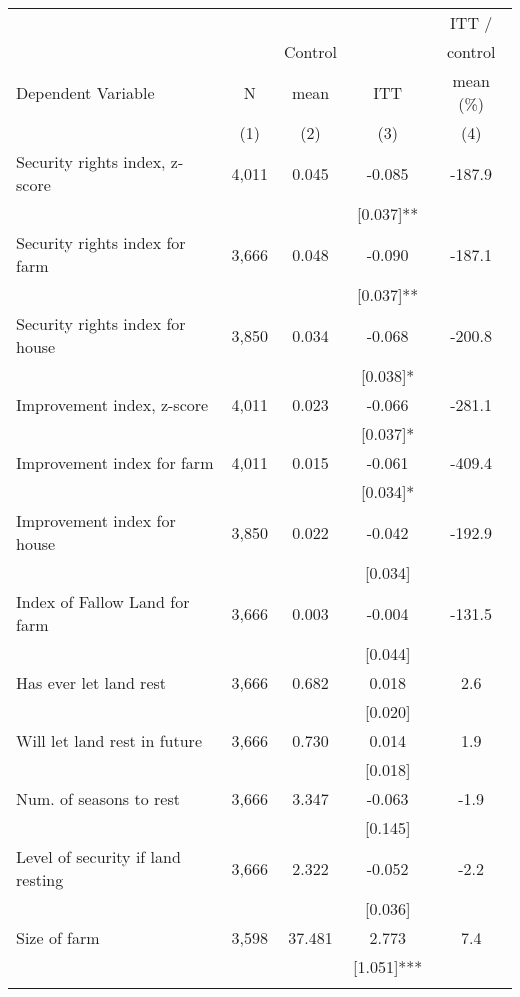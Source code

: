 \begin{tabular}{lcccc}
\hline \noalign{\smallskip} &  &  &  & ITT /\\
 &  & Control &  & control\\
Dependent Variable & N & mean & ITT & mean (\%)\\
 & (1) & (2) & (3) & (4)\\
\noalign{\smallskip}\hline \noalign{\smallskip}Security rights index, z-score & 4,011 & 0.045 & -0.085 & -187.9\\
 &  &  & [0.037]** & \\
\quad Security rights index for farm & 3,666 & 0.048 & -0.090 & -187.1\\
 &  &  & [0.037]** & \\
\quad Security rights index for house & 3,850 & 0.034 & -0.068 & -200.8\\
 &  &  & [0.038]* & \\
Improvement index, z-score & 4,011 & 0.023 & -0.066 & -281.1\\
 &  &  & [0.037]* & \\
\quad Improvement index for farm & 4,011 & 0.015 & -0.061 & -409.4\\
 &  &  & [0.034]* & \\
\quad Improvement index for house & 3,850 & 0.022 & -0.042 & -192.9\\
 &  &  & [0.034] & \\
Index of Fallow Land for farm & 3,666 & 0.003 & -0.004 & -131.5\\
 &  &  & [0.044] & \\
\quad Has ever let land rest & 3,666 & 0.682 & 0.018 & 2.6\\
 &  &  & [0.020] & \\
\quad Will let land rest in future & 3,666 & 0.730 & 0.014 & 1.9\\
 &  &  & [0.018] & \\
\quad Num. of seasons to rest & 3,666 & 3.347 & -0.063 & -1.9\\
 &  &  & [0.145] & \\
\quad Level of security if land resting & 3,666 & 2.322 & -0.052 & -2.2\\
 &  &  & [0.036] & \\
Size of farm & 3,598 & 37.481 & 2.773 & 7.4\\
 &  &  & [1.051]*** & \\
\noalign{\smallskip}\hline\end{tabular}
